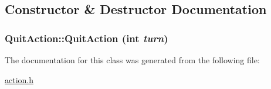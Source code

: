 \subsection{Constructor \& Destructor Documentation}
\hypertarget{classQuitAction_2289ac1a77e824192de8fd60b36d17e8}{
\subsubsection[{QuitAction}]{\setlength{\rightskip}{0pt plus 5cm}QuitAction::QuitAction (int {\em turn})}}
\label{classQuitAction_2289ac1a77e824192de8fd60b36d17e8}




The documentation for this class was generated from the following file:\begin{CompactItemize}
\item 
\hyperlink{action_8h}{action.h}\end{CompactItemize}
